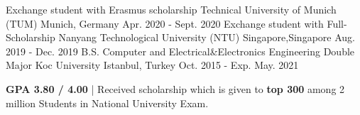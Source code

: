 \begin{cventries}

\cventry
    {Exchange student with Erasmus scholarship }
    {Technical University of Munich (TUM)} %
    {Munich, Germany} %
    {Apr. 2020 - Sept. 2020} %
    {} 
  \vspace{-4mm}
 \cventry
    {Exchange student with Full-Scholarship}
    {Nanyang Technological University (NTU)} %
    {Singapore,Singapore} %
    {Aug. 2019 - Dec. 2019} %
    {} 
\vspace{-4mm}
  \cventry
    {B.S. Computer and Electrical\&Electronics Engineering Double Major} %
    {Koc University } %
    {Istanbul, Turkey} %
    {Oct. 2015 - Exp. May. 2021} %
    {
      \begin{cvitems} %
        \item {\textbf{GPA 3.80 / 4.00} | Received scholarship which is given to \textbf{top 300} among 2 million Students in National University Exam.}
      \end{cvitems}
    } 
\vspace{2mm}    
\end{cventries}
